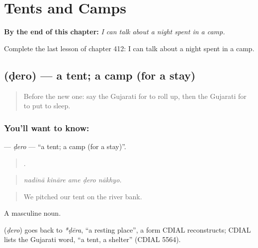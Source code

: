 
\chapter{Tents and Camps}
\label{ch:gu-tents-and-camps}

\begin{chapteropening}
\textbf{By the end of this chapter:} \emph{I can talk about a night spent in a camp.}

Complete the last lesson of chapter 412: I can talk about a night spent in a camp.
\end{chapteropening}

\section[\texorpdfstring{\gu{ડેરો} (ḍero)}{ડેરો (ḍero)}]{ (ḍero) — a tent; a camp (for a stay)}

\label{lesson:GU-C412-dero}



\begin{quote}
Before the new one: say the Gujarati for to roll up, then the Gujarati for to put to sleep.
\end{quote}

\subsection*{You'll want to know: }
\textbf{} — \emph{ḍero} — \textquotedblleft{}a tent; a camp (for a stay)\textquotedblright{}.

\begin{quote}
    .
\end{quote}

\begin{quote}
\emph{nadīnā kināre ame ḍero nākhyo.}
\end{quote}

\begin{quote}
We pitched our tent on the river bank.
\end{quote}

A masculine noun.

\begin{cousinweb}
\textbf{} (\emph{ḍero}) goes back to \emph{*ḍēra}, \textquotedblleft{}a resting place\textquotedblright{}, a form CDIAL reconstructs; CDIAL lists the Gujarati word, \textquotedblleft{}a tent, a shelter\textquotedblright{} (CDIAL 5564).
\end{cousinweb}

